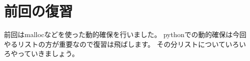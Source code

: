 \section{前回の復習}
前回はmallocなどを使った動的確保を行いました。
pythonでの動的確保は今回やるリストの方が重要なので復習は飛ばします。
その分リストについていろいろやっていきましょう。



